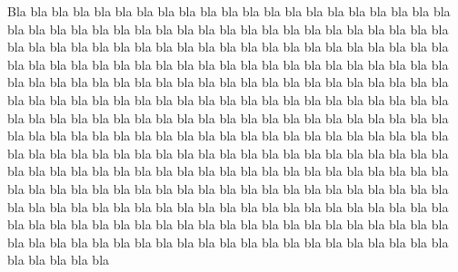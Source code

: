 \documentclass[english]{enstaPRE}
\begin{document}

\afficheGlossaire

\afficheIndex

\listedestables

\listedesfigures

Bla bla bla bla bla bla bla bla bla bla bla bla bla bla bla bla bla bla bla bla bla bla bla bla bla bla bla bla bla bla bla bla bla bla bla bla bla bla bla bla bla bla bla bla bla bla bla bla bla bla bla bla bla bla bla bla bla bla bla bla bla bla bla bla bla bla bla bla bla bla bla bla bla bla bla bla bla bla bla bla bla bla bla bla bla bla bla bla bla bla bla bla bla bla bla bla bla bla bla bla bla bla bla bla bla bla bla bla bla bla bla bla bla bla bla bla bla bla bla bla bla bla bla bla bla bla bla bla bla bla bla bla bla bla bla bla bla bla bla bla bla bla bla bla bla bla bla bla bla bla bla bla bla bla bla bla bla bla bla bla bla bla bla bla bla bla bla bla bla bla bla bla bla bla bla bla bla bla bla bla bla bla bla bla bla bla bla bla bla bla bla bla bla bla bla bla bla bla bla bla bla bla bla bla bla bla bla bla bla bla bla bla bla bla bla bla bla bla bla bla bla bla bla bla bla bla bla bla bla bla bla bla bla bla bla bla bla bla bla bla bla bla bla bla bla bla bla bla bla bla bla bla bla bla bla bla bla bla bla bla bla bla bla bla bla bla bla bla bla bla bla bla bla bla bla bla bla bla bla bla bla bla bla bla bla bla bla bla bla bla bla bla bla bla bla bla bla bla bla 
\end{document}
